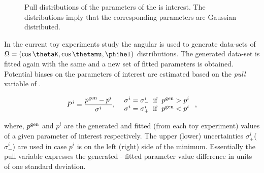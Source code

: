 \begin{figure}[h]
  \centering
  \begin{subfigure}{0.5\textwidth}
    \scalebox{0.60}{}
    \caption{}
    \label{pull_ACP0}
  \end{subfigure}%
  \hfill%
  \begin{subfigure}{0.5\textwidth}
    \scalebox{0.60}{}
    \caption{}
    \label{pull_ACPperp}
  \end{subfigure}
  \begin{subfigure}{0.5\textwidth}
    \scalebox{0.60}{}
    \caption{}
    \label{pull_ACPpar}
  \end{subfigure}%
  \hfill%
  \begin{subfigure}{0.5\textwidth}
    \scalebox{0.60}{}
    \caption{}
    \label{pull_ACPS}
  \end{subfigure}
\caption{Pull distributions of the parameters of the \Acp{i} interest. The distributions imply that the corresponding parameters are Gaussian distributed.}
\label{pull_acp}
\end{figure}

In the current toy experiments study the angular \pdf is used to generate data-sets of $\Omega = (\cos\thetaK,\cos\thetamu,\phihel)$ 
distributions. The generated data-set is fitted again with the same \pdf and a new set of fitted parameters is obtained. Potential
biases on the parameters of interest are estimated based on the {\it pull} variable of .

\begin{equation}
P^i = \frac{p^{\rm gen} - p^i}{ \sigma^i },\;\;\left. 
  \begin{array}{ll}
    \sigma^i = \sigma^i_- \;\;{\rm if}\;\; p^{\rm gen} > p^i  \\
    \sigma^i = \sigma^i_+ \;\;{\rm if}\;\; p^{\rm gen} < p^i 
  \end{array} \right. ,
\label{pull_def}
\end{equation}

\noindent where, $p^{\rm gen}$ and $p^i$ are the generated and fitted (from each toy experiment) values of a given parameter of interest
respectively. The upper (lower) uncertainties $\sigma^i_+$($\sigma^i_-$) are used in case $p^i$ is on the left (right) side of the minimum.
Essentially the pull variable expresses the generated - fitted parameter value difference in units of one standard deviation. 

